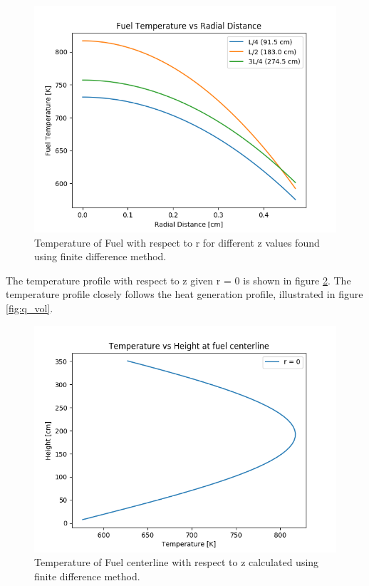 \documentclass[12pt,letterpaper]{article}
\begin{document}
\begin{figure}[htbp!]
    \begin{center}
        \includegraphics[scale=0.7]{numerical.png}
    \end{center}
    \caption{Temperature of Fuel with respect to r for different z values found using finite difference method.}
    \label{fig:numer}
\end{figure}


The temperature profile with respect to z given r = 0 is shown in figure \ref{fig:numer2}.
The temperature profile closely follows the heat generation profile, illustrated in
figure \ref{fig:q_vol}.


\begin{figure}[htbp!]
    \begin{center}
        \includegraphics[scale=0.7]{fuel_centerline.png}
    \end{center}
    \caption{Temperature of Fuel centerline with respect to z calculated using finite difference method.}
    \label{fig:numer2}
\end{figure}
\end{document}
